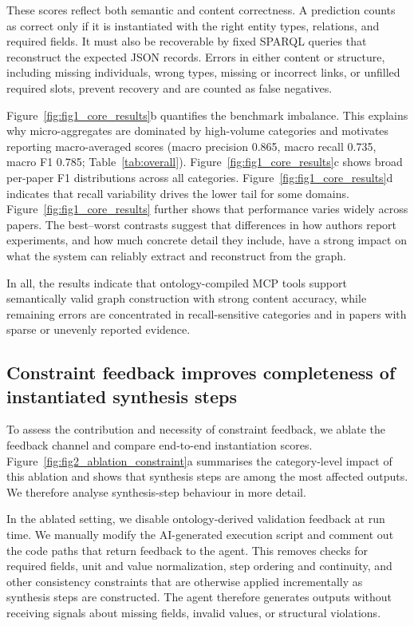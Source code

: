 These scores reflect both semantic and content correctness. A prediction counts as correct only if it is instantiated with the right entity types, relations, and required fields. It must also be recoverable by fixed SPARQL queries that reconstruct the expected JSON records. Errors in either content or structure, including missing individuals, wrong types, missing or incorrect links, or unfilled required slots, prevent recovery and are counted as false negatives.

Figure~\ref{fig:fig1_core_results}b quantifies the benchmark imbalance. This explains why micro-aggregates are dominated by high-volume categories and motivates reporting macro-averaged scores (macro precision 0.865, macro recall 0.735, macro F1 0.785; Table~\ref{tab:overall}). Figure~\ref{fig:fig1_core_results}c shows broad per-paper F1 distributions across all categories. Figure~\ref{fig:fig1_core_results}d indicates that recall variability drives the lower tail for some domains. Figure~\ref{fig:fig1_core_results} further shows that performance varies widely across papers. The best--worst contrasts suggest that differences in how authors report experiments, and how much concrete detail they include, have a strong impact on what the system can reliably extract and reconstruct from the graph.

In all, the results indicate that ontology-compiled MCP tools support semantically valid graph construction with strong content accuracy, while remaining errors are concentrated in recall-sensitive categories and in papers with sparse or unevenly reported evidence.


\subsection{Constraint feedback improves completeness of instantiated synthesis steps}

To assess the contribution and necessity of constraint feedback, we ablate the feedback channel and compare end-to-end instantiation scores. Figure~\ref{fig:fig2_ablation_constraint}a summarises the category-level impact of this ablation and shows that synthesis steps are among the most affected outputs. We therefore analyse synthesis-step behaviour in more detail.

In the ablated setting, we disable ontology-derived validation feedback at run time. We manually modify the AI-generated execution script and comment out the code paths that return feedback to the agent. This removes checks for required fields, unit and value normalization, step ordering and continuity, and other consistency constraints that are otherwise applied incrementally as synthesis steps are constructed. The agent therefore generates outputs without receiving signals about missing fields, invalid values, or structural violations.

